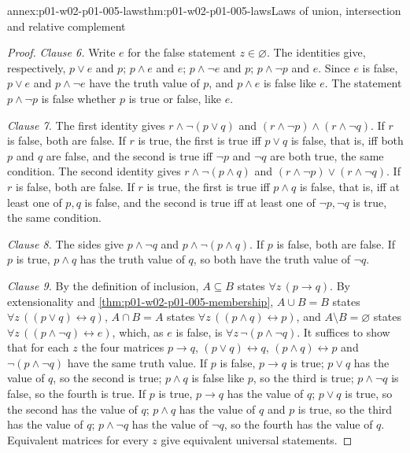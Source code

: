 \begin{annexitem}{annex:p01-w02-p01-005-laws}{thm:p01-w02-p01-005-laws}{Laws of union, intersection and relative complement}
\begin{proof}
\emph{Clause 6.} Write \(e\) for the false statement \(z\in\varnothing\). The
identities give, respectively, \(p\lor e\) and \(p\); \(p\land e\) and \(e\);
\(p\land\neg e\) and \(p\); \(p\land\neg p\) and \(e\). Since \(e\) is false,
\(p\lor e\) and \(p\land\neg e\) have the truth value of \(p\), and
\(p\land e\) is false like \(e\). The statement \(p\land\neg p\) is false
whether \(p\) is true or false, like \(e\).

\emph{Clause 7.} The first identity gives \(r\land\neg(p\lor q)\) and
\((r\land\neg p)\land(r\land\neg q)\). If \(r\) is false, both are false. If
\(r\) is true, the first is true iff \(p\lor q\) is false, that is, iff both
\(p\) and \(q\) are false, and the second is true iff \(\neg p\) and
\(\neg q\) are both true, the same condition. The second identity gives
\(r\land\neg(p\land q)\) and \((r\land\neg p)\lor(r\land\neg q)\). If \(r\) is
false, both are false. If \(r\) is true, the first is true iff \(p\land q\) is
false, that is, iff at least one of \(p,q\) is false, and the second is true
iff at least one of \(\neg p,\neg q\) is true, the same condition.

\emph{Clause 8.} The sides give \(p\land\neg q\) and \(p\land\neg(p\land q)\).
If \(p\) is false, both are false. If \(p\) is true, \(p\land q\) has the truth
value of \(q\), so both have the truth value of \(\neg q\).

\emph{Clause 9.} By the definition of inclusion, \(A\subseteq B\) states
\(\forall z\,(p\to q)\). By extensionality and
\cref{thm:p01-w02-p01-005-membership}, \(A\cup B=B\) states
\(\forall z\,((p\lor q)\leftrightarrow q)\), \(A\cap B=A\) states
\(\forall z\,((p\land q)\leftrightarrow p)\), and \(A\setminus B=\varnothing\)
states \(\forall z\,((p\land\neg q)\leftrightarrow e)\), which, as \(e\) is
false, is \(\forall z\,\neg(p\land\neg q)\). It suffices to show that for each
\(z\) the four matrices \(p\to q\), \((p\lor q)\leftrightarrow q\),
\((p\land q)\leftrightarrow p\) and \(\neg(p\land\neg q)\) have the same truth
value. If \(p\) is false, \(p\to q\) is true; \(p\lor q\) has the value of
\(q\), so the second is true; \(p\land q\) is false like \(p\), so the third is
true; \(p\land\neg q\) is false, so the fourth is true. If \(p\) is true,
\(p\to q\) has the value of \(q\); \(p\lor q\) is true, so the second has the
value of \(q\); \(p\land q\) has the value of \(q\) and \(p\) is true, so the
third has the value of \(q\); \(p\land\neg q\) has the value of \(\neg q\), so
the fourth has the value of \(q\). Equivalent matrices for every \(z\) give
equivalent universal statements.


\end{proof}
\end{annexitem}
